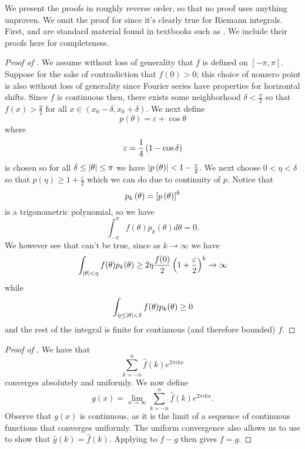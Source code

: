 \documentclass{article}
\begin{document}
We present the proofs in roughly reverse order, so that no proof uses anything unproven.
We omit the proof for  since it's clearly true for Riemann integrals.
First,  and  are standard material found in textbooks such as \cite{fourier-textbook}.
We include their proofs here for completeness.

\begin{proof}[Proof of ]
	We assume without loss of generality that $f$ is defined on $[-\pi, \pi]$.
	Suppose for the sake of contradiction that $f(0)>0$; this choice of nonzero point is also without loss of generality since Fourier series have properties for horizontal shifts.
	Since $f$ is continuous then, there exists some neighborhood $\delta<\frac{\pi}{2}$ so that $f(x)>\frac{y}{2}$ for all $x\in(x_0 - \delta, x_0 + \delta)$.
	We next define
	\begin{equation}
		p(\theta)=\varepsilon+\cos\theta
	\end{equation}
	where
	$$\varepsilon=\frac{1}{4}\left(1-\cos\delta\right)$$
	is chosen so for all $\delta\leq\abs{\theta}\leq\pi$ we have $\abs{p\left(\theta\right)}<1-\frac{\varepsilon}{2}$.
	We next choose $0<\eta<\delta$ so that $p(\eta)\geq 1 +\frac{\varepsilon}{2}$ which we can do due to continuity of $p$.
	Notice that
	$$p_k\left(\theta\right)=\left[p\left(\theta\right)\right]^k$$
	is a trigonometric polynomial, so we have
	\begin{equation*}
		\int_{-\pi}^\pi f(\theta) p_k(\theta)d\theta = 0.
	\end{equation*}
	We however see that can't be true, since as $k\rightarrow\infty$ we have
	\begin{equation*}
		\int_{\abs{\theta}<\eta}f(\theta)p_k(\theta)\geq 2\eta\frac{f(0)}{2}\left(1+\frac{\varepsilon}{2}\right)^k\rightarrow\infty
	\end{equation*}
	while
	\begin{equation*}
		\int_{\eta\leq\abs{\theta}<\delta}f(\theta)p_k(\theta)\geq 0
	\end{equation*}
	and the rest of the integral is finite for continuous (and therefore bounded) $f$.
\end{proof}

\begin{proof}[Proof of ]
	We have that
	\begin{equation}
		\sum_{k=-n}^n \hat{f}(k) e^{2\pi i k x}
	\end{equation}
	converges absolutely and uniformly.
	We now define
	\begin{equation}
		g(x)=\lim_{n\rightarrow\infty}\sum_{k=-n}^n \hat{f}(k) e^{2\pi i k x}.
	\end{equation}
	Observe that $g(x)$ is continuous, as it is the limit of a sequence of continuous functions that converges uniformly.
	The uniform convergence also allows us to use  to show that $\hat{g}(k)=\hat{f}(k)$.
	Applying  to $f-g$ then gives $f=g$.
\end{proof}
\end{document}
